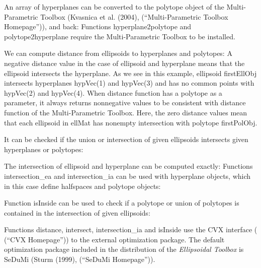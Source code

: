 \documentclass[letterpaper,10pt,english]{sphinxmanual}
\begin{document}
An array of hyperplanes can be converted to the polytope object of the
Multi-Parametric Toolbox (Kvasnica et al. (2004), (“Multi-Parametric
Toolbox Homepage”)), and back: Functions hyperplane2polytope and
polytope2hyperplane require the Multi-Parametric Toolbox to be
installed.

We can compute distance from ellipsoids to hyperplanes and polytopes: A
negative distance value in the case of ellipsoid and hyperplane means
that the ellipsoid intersects the hyperplane. As we see in this example,
ellipsoid firstEllObj intersects hyperplanes hypVec(1) and hypVec(3) and
has no common points with hypVec(2) and hypVec(4). When distance
function has a polytope as a parameter, it always returns nonnegative
values to be consistent with distance function of the Multi-Parametric
Toolbox. Here, the zero distance values mean that each ellipsoid in
ellMat has nonempty intersection with polytope firstPolObj.

It can be checked if the union or intersection of given ellipsoids
intersects given hyperplanes or polytopes:

The intersection of ellipsoid and hyperplane can be computed exactly:
Functions intersection\_ea and intersection\_ia can be used with
hyperplane objects, which in this case define halfspaces and polytope
objects:

Function isInside can be used to check if a polytope or union of
polytopes is contained in the intersection of given ellipsoids:

Functions distance, intersect, intersection\_ia and isInside use the CVX
interface ( (“CVX Homepage”)) to the external optimization package. The
default optimization package included in the distribution of the
\emph{Ellipsoidal Toolbox} is SeDuMi (Sturm (1999), (“SeDuMi Homepage”)).
\end{document}
